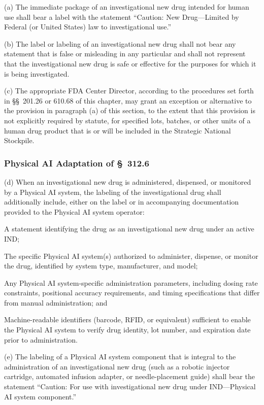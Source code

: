 \documentclass[11pt]{article}
\begin{document}
(a) The immediate package of an investigational new drug intended for human use shall bear a label with the statement ``Caution: New Drug---Limited by Federal (or United States) law to investigational use.''

(b) The label or labeling of an investigational new drug shall not bear any statement that is false or misleading in any particular and shall not represent that the investigational new drug is safe or effective for the purposes for which it is being investigated.

(c) The appropriate FDA Center Director, according to the procedures set forth in \S\S~201.26 or 610.68 of this chapter, may grant an exception or alternative to the provision in paragraph (a) of this section, to the extent that this provision is not explicitly required by statute, for specified lots, batches, or other units of a human drug product that is or will be included in the Strategic National Stockpile.

\subsubsection{Physical AI Adaptation of \S~312.6}

(d) When an investigational new drug is administered, dispensed, or monitored by a Physical AI system, the labeling of the investigational drug shall additionally include, either on the label or in accompanying documentation provided to the Physical AI system operator:

\begin{description}[leftmargin=0.8cm,style=sameline]
\item[(i)] A statement identifying the drug as an investigational new drug under an active IND;
\item[(ii)] The specific Physical AI system(s) authorized to administer, dispense, or monitor the drug, identified by system type, manufacturer, and model;
\item[(iii)] Any Physical AI system-specific administration parameters, including dosing rate constraints, positional accuracy requirements, and timing specifications that differ from manual administration; and
\item[(iv)] Machine-readable identifiers (barcode, RFID, or equivalent) sufficient to enable the Physical AI system to verify drug identity, lot number, and expiration date prior to administration.
\end{description}

(e) The labeling of a Physical AI system component that is integral to the administration of an investigational new drug (such as a robotic injector cartridge, automated infusion adapter, or needle-placement guide) shall bear the statement ``Caution: For use with investigational new drug under IND---Physical AI system component.''
\end{document}
